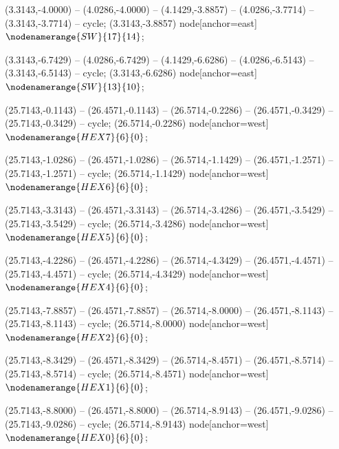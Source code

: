    (3.3143,-4.0000) -- (4.0286,-4.0000) -- (4.1429,-3.8857) -- (4.0286,-3.7714) -- (3.3143,-3.7714) -- cycle;
   (3.3143,-3.8857) node[anchor=east] {$\nodenamerange{SW}{17}{14}$};

   (3.3143,-6.7429) -- (4.0286,-6.7429) -- (4.1429,-6.6286) -- (4.0286,-6.5143) -- (3.3143,-6.5143) -- cycle;
   (3.3143,-6.6286) node[anchor=east] {$\nodenamerange{SW}{13}{10}$};

   (25.7143,-0.1143) -- (26.4571,-0.1143) -- (26.5714,-0.2286) -- (26.4571,-0.3429) -- (25.7143,-0.3429) -- cycle;
   (26.5714,-0.2286) node[anchor=west] {$\nodenamerange{HEX7}{6}{0}$};

   (25.7143,-1.0286) -- (26.4571,-1.0286) -- (26.5714,-1.1429) -- (26.4571,-1.2571) -- (25.7143,-1.2571) -- cycle;
   (26.5714,-1.1429) node[anchor=west] {$\nodenamerange{HEX6}{6}{0}$};

   (25.7143,-3.3143) -- (26.4571,-3.3143) -- (26.5714,-3.4286) -- (26.4571,-3.5429) -- (25.7143,-3.5429) -- cycle;
   (26.5714,-3.4286) node[anchor=west] {$\nodenamerange{HEX5}{6}{0}$};

   (25.7143,-4.2286) -- (26.4571,-4.2286) -- (26.5714,-4.3429) -- (26.4571,-4.4571) -- (25.7143,-4.4571) -- cycle;
   (26.5714,-4.3429) node[anchor=west] {$\nodenamerange{HEX4}{6}{0}$};

   (25.7143,-7.8857) -- (26.4571,-7.8857) -- (26.5714,-8.0000) -- (26.4571,-8.1143) -- (25.7143,-8.1143) -- cycle;
   (26.5714,-8.0000) node[anchor=west] {$\nodenamerange{HEX2}{6}{0}$};

   (25.7143,-8.3429) -- (26.4571,-8.3429) -- (26.5714,-8.4571) -- (26.4571,-8.5714) -- (25.7143,-8.5714) -- cycle;
   (26.5714,-8.4571) node[anchor=west] {$\nodenamerange{HEX1}{6}{0}$};

   (25.7143,-8.8000) -- (26.4571,-8.8000) -- (26.5714,-8.9143) -- (26.4571,-9.0286) -- (25.7143,-9.0286) -- cycle;
   (26.5714,-8.9143) node[anchor=west] {$\nodenamerange{HEX0}{6}{0}$};

